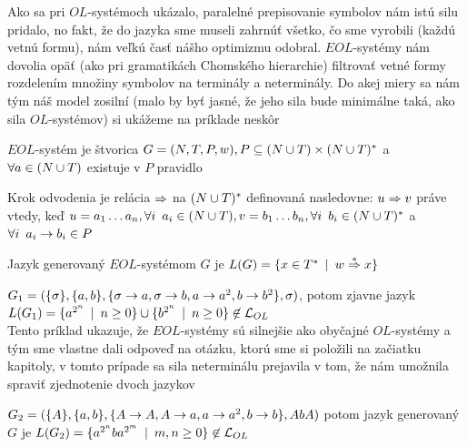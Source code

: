 Ako sa pri $OL$-systémoch ukázalo, paralelné prepisovanie symbolov
nám istú silu pridalo, no fakt, že do jazyka sme museli zahrnúť
všetko, čo sme vyrobili (každú vetnú formu), nám veľkú časť nášho
optimizmu odobral. $EOL$-systémy nám dovolia opäť (ako pri
gramatikách Chomského hierarchie) filtrovať vetné formy rozdelením
množiny symbolov na terminály a neterminály. Do akej miery sa nám
tým náš model zosilní (malo by byť jasné, že jeho sila bude
minimálne taká, ako sila $OL$-systémov) si ukážeme na príklade
neskôr

\begin{definicia}
  $EOL$-systém je štvorica $G=(N,T,P,w), P\subseteq (N\cup
  T)\times(N\cup T)^{*}$ a $\forall a\in (N\cup T)$ existuje v $P$
  pravidlo
\end{definicia}

\begin{definicia}
  Krok odvodenia je relácia $\Rightarrow$ na $(N\cup T)^{*}$ definovaná
  nasledovne: \mbox{$u\Rightarrow v$} práve vtedy, keď $u=a_{1}\dots
  a_{n},\forall i\enspace a_{i}\in(N\cup T),v=b_{1}\dots b_{n},\forall
  i\enspace b_{i}\in(N\cup T)^{*}$ a $\forall i\enspace a_{i}\rightarrow b_{i}\in P$
\end{definicia}

\begin{definicia}
  Jazyk generovaný $EOL$-systémom $G$ je $L(G)=\{x\in T^{*}\enspace |\enspace
  w\overset{*}{\Rightarrow} x\}$
\end{definicia}

\begin{priklad}
  $G_{1}=(\{\sigma\},\{a,b\},\{\sigma\rightarrow a,\sigma\rightarrow b,a\rightarrow
  a^{2},b\rightarrow b^{2}\},\sigma)$, potom zjavne jazyk
  $L(G_{1})=\{a^{2^{n}}\enspace |\enspace n\geq0 \}\cup\{b^{2^{n}}\enspace |\enspace
  n\geq0\}\not\in\mathcal{L}_{OL}$\\ Tento príklad ukazuje, že
  $EOL$-systémy sú silnejšie ako obyčajné $OL$-systémy a tým sme
  vlastne dali odpoveď na otázku, ktorú sme si položili na začiatku
  kapitoly, v tomto prípade sa sila neterminálu prejavila v tom, že
  nám umožnila spraviť zjednotenie dvoch jazykov
\end{priklad}

\begin{priklad}
  $G_{2}=(\{A\},\{a,b\},\{A\rightarrow A,A\rightarrow a,a\rightarrow a^{2},b\rightarrow b\},AbA)$
  potom jazyk ge\-ne\-ro\-va\-ný $G$ je
  $L(G_{2})=\{a^{2^{n}}ba^{2^{m}}\enspace |\enspace
  m,n\geq0\}\not\in\mathcal{L}_{OL}$
\end{priklad}

